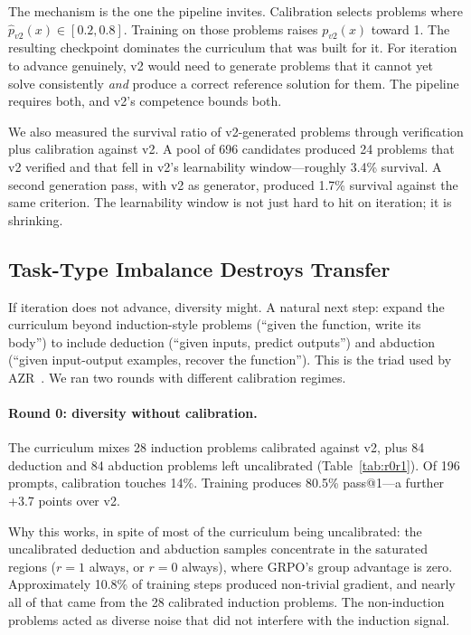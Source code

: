 \documentclass[11pt,a4paper]{article}
\begin{document}
The mechanism is the one the pipeline invites.
Calibration selects problems where $\hat{p}_{v2}(x) \in [0.2, 0.8]$.
Training on those problems raises $p_{v2}(x)$ toward 1.
The resulting checkpoint dominates the curriculum that was built for it.
For iteration to advance genuinely, v2 would need to generate problems that it cannot yet solve consistently \emph{and} produce a correct reference solution for them.
The pipeline requires both, and v2's competence bounds both.

We also measured the survival ratio of v2-generated problems through verification plus calibration against v2.
A pool of 696 candidates produced 24 problems that v2 verified and that fell in v2's learnability window---roughly 3.4\% survival.
A second generation pass, with v2 as generator, produced 1.7\% survival against the same criterion.
The learnability window is not just hard to hit on iteration; it is shrinking.

\subsection{Task-Type Imbalance Destroys Transfer}
\label{sec:limits-type}

If iteration does not advance, diversity might.
A natural next step: expand the curriculum beyond induction-style problems (``given the function, write its body'') to include deduction (``given inputs, predict outputs'') and abduction (``given input-output examples, recover the function'').
This is the triad used by AZR~\citep{zhao2025azr}.
We ran two rounds with different calibration regimes.

\paragraph{Round 0: diversity without calibration.}
The curriculum mixes 28 induction problems calibrated against v2, plus 84 deduction and 84 abduction problems left uncalibrated (Table~\ref{tab:r0r1}).
Of 196 prompts, calibration touches 14\%.
Training produces 80.5\% pass@1---a further +3.7 points over v2.

Why this works, in spite of most of the curriculum being uncalibrated: the uncalibrated deduction and abduction samples concentrate in the saturated regions ($r = 1$ always, or $r = 0$ always), where GRPO's group advantage is zero.
Approximately 10.8\% of training steps produced non-trivial gradient, and nearly all of that came from the 28 calibrated induction problems.
The non-induction problems acted as diverse noise that did not interfere with the induction signal.
\end{document}
